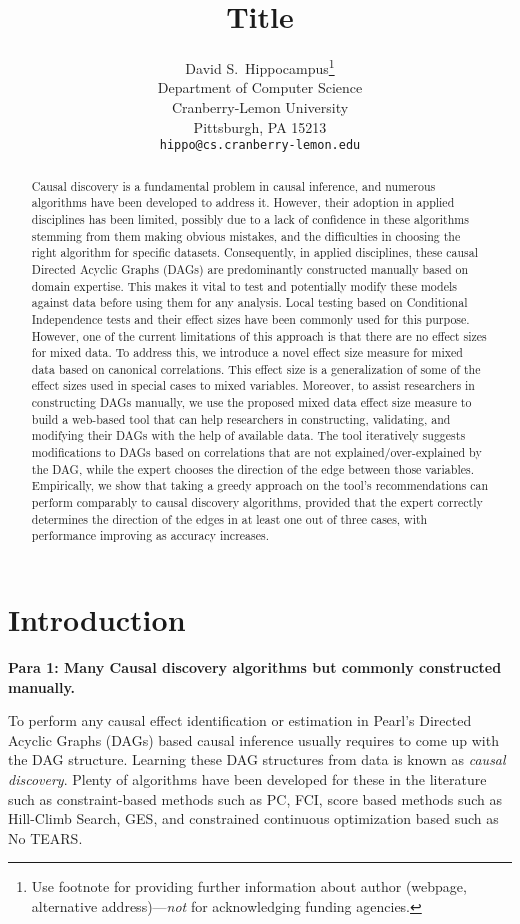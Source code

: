 \documentclass{article}
\title{Title}
\author{%
  David S.~Hippocampus\thanks{Use footnote for providing further information
    about author (webpage, alternative address)---\emph{not} for acknowledging
    funding agencies.} \\
  Department of Computer Science\\
  Cranberry-Lemon University\\
  Pittsburgh, PA 15213 \\
  \texttt{hippo@cs.cranberry-lemon.edu} \\
}
\begin{document}
\maketitle


\begin{abstract}
	Causal discovery is a fundamental problem in causal inference, and
	numerous algorithms have been developed to address it. However, their
	adoption in applied disciplines  has been limited, possibly due to a
	lack of confidence in these algorithms stemming from them making
	obvious mistakes, and the difficulties in choosing the right algorithm
	for specific datasets. Consequently, in applied disciplines, these
	causal Directed Acyclic Graphs (DAGs) are predominantly constructed
	manually based on domain expertise. This makes it vital to test and
	potentially modify these models against data before using them for any
	analysis. Local testing based on Conditional Independence tests and
	their effect sizes have been commonly used for this purpose. However,
	one of the current limitations of this approach is that there are no
	effect sizes for mixed data. To address this, we introduce a novel
	effect size measure for mixed data based on canonical correlations.
	This effect size is a generalization of some of the effect sizes used
	in special cases to mixed variables. Moreover, to assist researchers in
	constructing DAGs manually, we use the proposed mixed data effect size
	measure to build a web-based tool that can help researchers in
	constructing, validating, and modifying their DAGs with the help of
	available data. The tool iteratively suggests modifications to DAGs
	based on correlations that are not explained/over-explained by the DAG,
	while the expert chooses the direction of the edge between those
	variables. Empirically, we show that taking a greedy approach on the
	tool's recommendations can perform comparably to causal discovery
	algorithms, provided that the expert correctly determines the direction
	of the edges in at least one out of three cases, with performance
	improving as accuracy increases.
\end{abstract}

\section{Introduction}
\textbf{Para 1: Many Causal discovery algorithms but commonly constructed manually.}

To perform any causal effect identification or estimation in Pearl's Directed
Acyclic Graphs (DAGs) based causal inference usually requires to come up with
the DAG structure. Learning these DAG structures from data is known as
\emph{causal discovery}. Plenty of algorithms have been developed for these in
the literature such as constraint-based methods such as PC, FCI, score based
methods such as Hill-Climb Search, GES, and constrained continuous optimization
based such as No TEARS.
\end{document}
